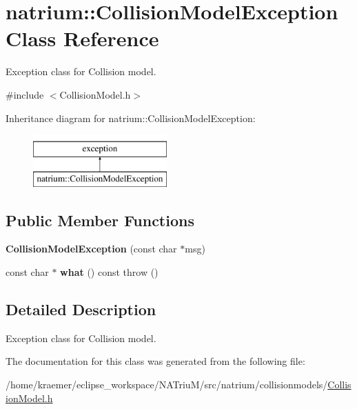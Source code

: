 \hypertarget{classnatrium_1_1CollisionModelException}{\section{natrium\-:\-:Collision\-Model\-Exception Class Reference}
\label{classnatrium_1_1CollisionModelException}
}


Exception class for Collision model.  




{\ttfamily \#include $<$Collision\-Model.\-h$>$}

Inheritance diagram for natrium\-:\-:Collision\-Model\-Exception\-:\begin{figure}[H]
\begin{center}
\leavevmode
\includegraphics[height=2.000000cm]{classnatrium_1_1CollisionModelException}
\end{center}
\end{figure}
\subsection*{Public Member Functions}
\begin{DoxyCompactItemize}
\item 
\hypertarget{classnatrium_1_1CollisionModelException_a3dfd3ec49f974ce0601c18d3b2c4b673}{{\bfseries Collision\-Model\-Exception} (const char $\ast$msg)}\label{classnatrium_1_1CollisionModelException_a3dfd3ec49f974ce0601c18d3b2c4b673}

\item 
\hypertarget{classnatrium_1_1CollisionModelException_a049e6777986f1bb96056a52400753063}{const char $\ast$ {\bfseries what} () const   throw ()}\label{classnatrium_1_1CollisionModelException_a049e6777986f1bb96056a52400753063}

\end{DoxyCompactItemize}


\subsection{Detailed Description}
Exception class for Collision model. 

The documentation for this class was generated from the following file\-:\begin{DoxyCompactItemize}
\item 
/home/kraemer/eclipse\-\_\-workspace/\-N\-A\-Triu\-M/src/natrium/collisionmodels/\hyperlink{CollisionModel_8h}{Collision\-Model.\-h}\end{DoxyCompactItemize}
